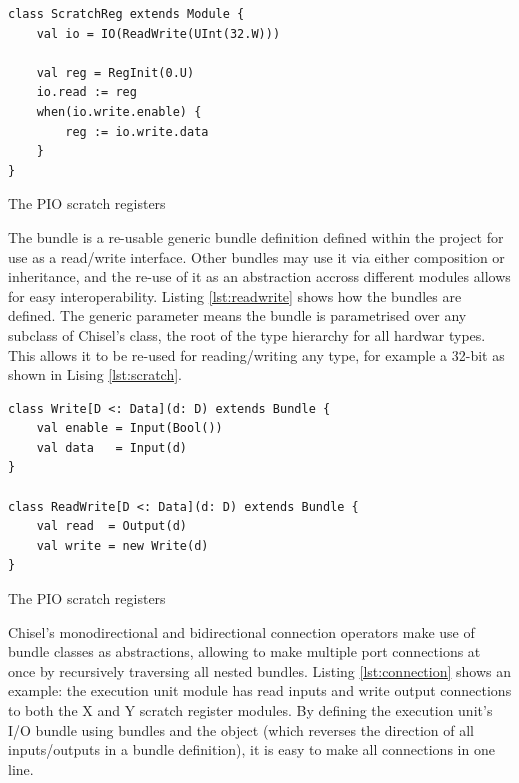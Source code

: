 \begin{listing}[h!]
    \vspace{0.5cm}
    \begin{verbatim}
class ScratchReg extends Module {
    val io = IO(ReadWrite(UInt(32.W)))
    
    val reg = RegInit(0.U)
    io.read := reg
    when(io.write.enable) {
        reg := io.write.data
    }
}
    \end{verbatim}
    \caption{The PIO scratch registers}
    \label{lst:scratch}
\end{listing}

The  bundle is a re-usable generic bundle definition defined within the project for use as a read/write interface. Other bundles may use it via either composition or inheritance, and the re-use of it as an abstraction accross different modules allows for easy interoperability. Listing \ref{lst:readwrite} shows how the bundles are defined. The generic parameter  means the bundle is parametrised over any subclass of Chisel's  class, the root of the type hierarchy for all hardwar types. This allows it to be re-used for reading/writing any type, for example a 32-bit  as shown in Lising \ref{lst:scratch}.

\begin{listing}[h!]
    \vspace{0.5cm}
    \begin{verbatim}
class Write[D <: Data](d: D) extends Bundle {
    val enable = Input(Bool())
    val data   = Input(d)
}

class ReadWrite[D <: Data](d: D) extends Bundle {
    val read  = Output(d)
    val write = new Write(d)
}
    \end{verbatim}
    \caption{The PIO scratch registers}
    \label{lst:readwrite}
\end{listing}

Chisel's monodirectional \txt{:=} and bidirectional \txt{<>} connection operators make use of bundle classes as abstractions, allowing to make multiple port connections at once by recursively traversing all nested bundles. Listing \ref{lst:connection} shows an example: the execution unit module has read inputs and write output connections to both the X and Y scratch register modules. By defining the execution unit's I/O bundle using  bundles and the  object (which reverses the direction of all inputs/outputs in a bundle definition), it is easy to make all connections in one line.

